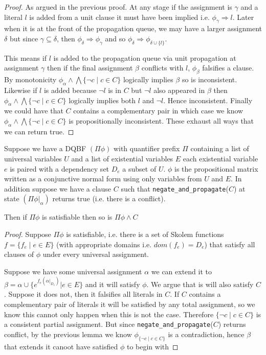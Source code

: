 \documentclass[runningheads]{llncs}
\begin{document}
\begin{proof}
	As argued in the previous proof. At any stage if the assignment is $\gamma$ and a literal $l$ is added from a unit clause it must have been implied  i.e. $\phi_{\gamma}\Rightarrow l$. Later when it is at the front of the propagation queue, we may have a larger assignment  $\delta$ but since $\gamma \subseteq \delta$, then $\phi_{\delta}\Rightarrow\phi_{\gamma}$ and so $\phi_{\delta} \Rightarrow \phi_{\delta\cup \{l\}}$. 

	
	This means if $l$ is added to the propagation queue via unit propagation at assignment $\gamma$ then if the final assignment $\beta$ conflicts with $l$, $\phi_\beta$ falsifies a clause. By monotonicity $\phi_{\alpha}\wedge \bigwedge\{\neg c \mid c \in C\}$ logically implies $\beta$ so is inconsistent.
	Likewise if $l$ is added because $\neg l$ is in $C$ but $\neg l$ also appeared in $\beta$ then $\phi_{\alpha}\wedge \bigwedge\{\neg c \mid c \in C\}$ logically implies both $l$ and $\lnot l$. Hence inconsistent. Finally we could have that $C$ contains a complementary pair in which case we know $\phi_{\alpha}\wedge \bigwedge\{\neg c \mid c \in C\}$ is propositionally inconsistent. These exhaust all ways that we can return true.
\end{proof}
	
	\begin{corollary}[RUP]
		Suppose we have a DQBF $(\Pi \phi)$ with quantifier prefix $\Pi$ containing a list of universal variables $U$ and a list of existential variables $E$ each existential variable $e$ is paired with a dependency set $D_e$ a subset of $U$. $\phi$ is the propositional matrix written as a conjunctive normal form using only variables from $U$ and $E$. %
		In addition suppose we have a clause $C$ such that \texttt{negate\_and\_propagate}($C$) at state  $(\Pi \phi|_\alpha)$ returns true (i.e. there is a conflict).
		
		Then if $\Pi \phi$ is satisfiable then so is $\Pi \phi\wedge C$
	\end{corollary}
	\begin{proof}
		Suppose $\Pi \phi$ is satisfiable, i.e. there is a set of Skolem functions $f=\{f_e \mid e\in E \}$ (with appropriate domains i.e. $dom(f_e)=D_e$) that satisfy all clauses of $\phi$ under every universal assignment.
		
		Suppose we have some universal assignment $\alpha$ we can extend it to $\beta= \alpha\cup \{e^{f_e(\alpha|_{D_e})} | e\in E\}$ and it will satisfy $\phi$. We argue that is will also satisfy $C$.
		Suppose it does not, 
		then it falsifies all literals in $C$. 		If $C$ contains a complementary pair of literals it will be satisfied by any total assignment, so we know this cannot only happen when this is not the case. 
		Therefore $\{\neg c \mid c \in C\}$ is a consistent partial assignment. But since \texttt{negate\_and\_propagate}($C$) returns conflict, by the previous lemma we know $\phi_{\{\neg c \mid c \in C\}}$ is a contradiction, hence  $\beta$ that extends it canoot have satisfied $\phi$ to begin with
	\end{proof}
	
\end{document}
